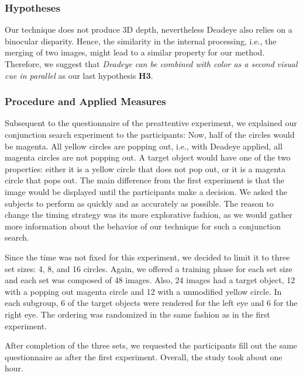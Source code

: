 \documentclass[journal]{vgtc}                %
\begin{document}
\subsubsection{Hypotheses}

Our technique does not produce 3D depth, nevertheless Deadeye also relies on a binocular disparity. Hence, the similarity in the internal processing, i.e., the merging of two images, might lead to a similar property for our method. Therefore, we suggest that \textit{Deadeye can be combined with color as a second visual cue in parallel} as our last hypothesis \textbf{H3}.



\subsubsection{Procedure and Applied Measures}


Subsequent to the questionnaire of the preattentive experiment, we explained our conjunction search experiment to the participants: Now, half of the circles would be magenta. All yellow circles are popping out, i.e., with Deadeye applied, all magenta circles are not popping out. A target object would have one of the two properties: either it is a yellow circle that does not pop out, or it is a magenta circle that pops out. The main difference from the first experiment is that the image would be displayed until the participants make a decision. We asked the subjects to perform as quickly and as accurately as possible. The reason to change the timing strategy was its more explorative fashion, as we would gather more information about the behavior of our technique for such a conjunction search.

Since the time was not fixed for this experiment, we decided to limit it to three set sizes: 4, 8, and 16 circles. Again, we offered a training phase for each set size and each set was composed of 48 images. Also, 24 images had a target object, 12 with a popping out magenta circle and 12 with a unmodified yellow circle. In each subgroup, 6 of the target objects were rendered for the left eye and 6 for the right eye. The ordering was randomized in the same fashion as in the first experiment.

After completion of the three sets, we requested the participants fill out the same questionnaire as after the first experiment. Overall, the study took about one hour. 
\end{document}
